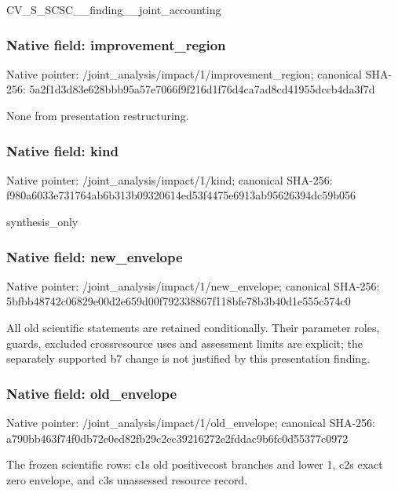 \documentclass[10pt,a4paper]{article}
\begin{document}
CV\_S\_SCSC\_\_finding\_\_joint\_accounting


\subsubsection{Native field: improvement\_region}


Native pointer: /joint\_analysis/impact/1\allowbreak{}/improvement\_region; canonical SHA-256: 5a2f1d3d83e628bbb95a57e7\allowbreak{}066f9f216d1f76d4ca7ad8cd\allowbreak{}41955dccb4da3f7d


None from presentation restructuring.


\subsubsection{Native field: kind}


Native pointer: /joint\_analysis/impact/1/kind; canonical SHA-256: f980a6033e731764ab6b313b\allowbreak{}09320614ed53f4475e6913ab\allowbreak{}95626394dc59b056


synthesis\_only


\subsubsection{Native field: new\_envelope}


Native pointer: /joint\_analysis/impact/1/new\_envelope; canonical SHA-256: 5bfbb48742c06829e00d2e65\allowbreak{}9d00f792338867f118bfe78b\allowbreak{}3b40d1e555c574c0


All old scientific statements are retained conditionally. Their parameter roles, guards, excluded crossresource uses and assessment limits are explicit; the separately supported b7 change is not justified by this presentation finding.


\subsubsection{Native field: old\_envelope}


Native pointer: /joint\_analysis/impact/1/old\_envelope; canonical SHA-256: a790bb463f74f0db72e0ed82\allowbreak{}fb29c2ec39216272e2fddac9\allowbreak{}b6fc0d55377c0972


The frozen scientific rows: c1s old positivecost branches and lower 1, c2s exact zero envelope, and c3s unassessed resource record.
\end{document}
